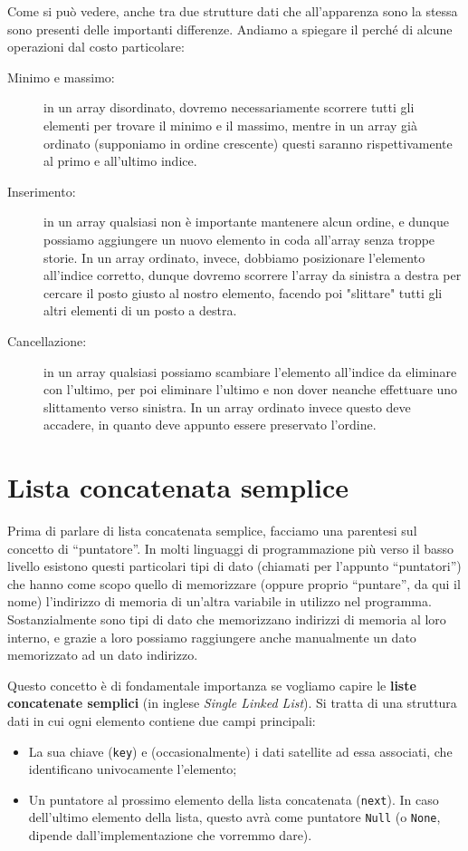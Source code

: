 \documentclass[12pt]{report}
\begin{document}
    Come si può vedere, anche tra due strutture dati che all'apparenza sono la stessa sono presenti delle importanti differenze.
    Andiamo a spiegare il perché di alcune operazioni dal costo particolare:
    \begin{description}
    	
    	\item [Minimo e massimo:] in un array disordinato, dovremo necessariamente scorrere tutti gli elementi per trovare il minimo e il massimo, mentre in un array già ordinato (supponiamo in ordine crescente) questi saranno rispettivamente al primo e all'ultimo indice.
    	
    	\item [Inserimento:] in un array qualsiasi non è importante mantenere alcun ordine, e dunque possiamo aggiungere un nuovo elemento in coda all'array senza troppe storie. In un array ordinato, invece, dobbiamo posizionare l'elemento all'indice corretto, dunque dovremo scorrere l'array da sinistra a destra per cercare il posto giusto al nostro elemento, facendo poi "slittare" tutti gli altri elementi di un posto a destra.
    	
    	\item [Cancellazione:] in un array qualsiasi possiamo scambiare l'elemento all'indice da eliminare con l'ultimo, per poi eliminare l'ultimo e non dover neanche effettuare uno slittamento verso sinistra. In un array ordinato invece questo deve accadere, in quanto deve appunto essere preservato l'ordine.
    	
    \end{description}
    
    \newpage
    \section{Lista concatenata semplice}
    Prima di parlare di lista concatenata semplice, facciamo una parentesi sul concetto di ``puntatore''.
    In molti linguaggi di programmazione più verso il basso livello esistono questi particolari tipi di dato (chiamati per l'appunto ``puntatori'') che hanno come scopo quello di memorizzare (oppure proprio ``puntare'', da qui il nome) l'indirizzo di memoria di un'altra variabile in utilizzo nel programma. Sostanzialmente sono tipi di dato che memorizzano indirizzi di memoria al loro interno, e grazie a loro possiamo raggiungere anche manualmente un dato memorizzato ad un dato indirizzo.
    
    Questo concetto è di fondamentale importanza se vogliamo capire le \textbf{liste concatenate semplici} (in inglese \textit{Single Linked List}). Si tratta di una struttura dati in cui ogni elemento contiene due campi principali:
    \begin{itemize}
    	\item La sua chiave (\texttt{key}) e (occasionalmente) i dati satellite ad essa associati, che identificano univocamente l'elemento;
    	\item Un puntatore al prossimo elemento della lista concatenata (\texttt{next}). In caso dell'ultimo elemento della lista, questo avrà come puntatore \texttt{Null} (o \texttt{None}, dipende dall'implementazione che vorremmo dare).
    \end{itemize}
    
\end{document}
